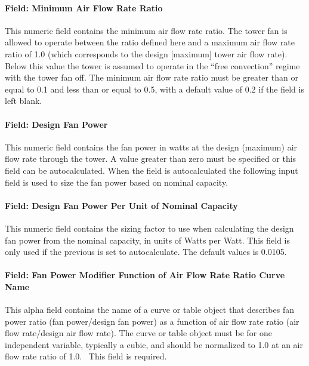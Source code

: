 \paragraph{Field: Minimum Air Flow Rate Ratio}\label{field-minimum-air-flow-rate-ratio}

This numeric field contains the minimum air flow rate ratio. The tower fan is allowed to operate between the ratio defined here and a maximum air flow rate ratio of 1.0 (which corresponds to the design {[}maximum{]} tower air flow rate). Below this value the tower is assumed to operate in the ``free convection'' regime with the tower fan off. The minimum air flow rate ratio must be greater than or equal to 0.1 and less than or equal to 0.5, with a default value of 0.2 if the field is left blank.

\paragraph{Field: Design Fan Power}\label{field-design-fan-power}

This numeric field contains the fan power in watts at the design (maximum) air flow rate through the tower. A value greater than zero must be specified or this field can be autocalculated. When the field is autocalculated the following input field is used to size the fan power based on nominal capacity.

\paragraph{Field: Design Fan Power Per Unit of Nominal Capacity}\label{field-design-fan-power-per-unit-of-nominal-capacity}

This numeric field contains the sizing factor to use when calculating the design fan power from the nominal capacity, in units of Watts per Watt. This field is only used if the previous is set to autocalculate. The default values is 0.0105.

\paragraph{Field: Fan Power Modifier Function of Air Flow Rate Ratio Curve Name}\label{field-fan-power-modifier-function-of-air-flow-rate-ratio-curve-name}

This alpha field contains the name of a curve or table object that describes fan power ratio (fan power/design fan power) as a function of air flow rate ratio (air flow rate/design air flow rate). The curve or table object must be for one independent variable, typically a cubic, and should be normalized to 1.0 at an air flow rate ratio of 1.0.~ This field is required.

